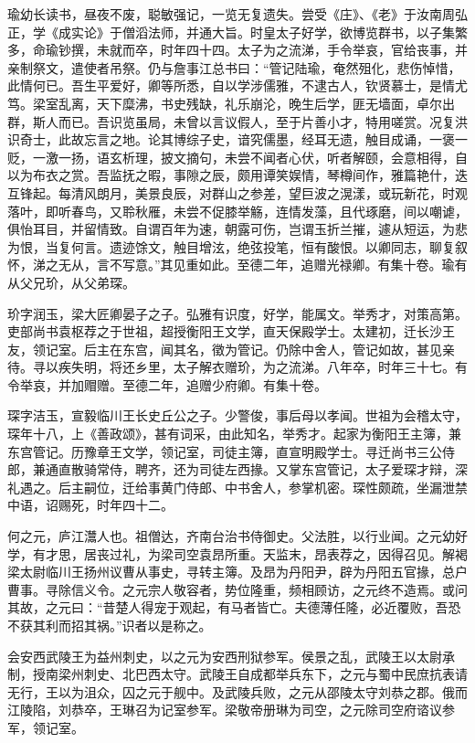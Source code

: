 \documentclass[]{article}
\begin{document}
瑜幼长读书，昼夜不废，聪敏强记，一览无复遗失。尝受《庄》、《老》于汝南周弘正，学《成实论》于僧滔法师，并通大旨。时皇太子好学，欲博览群书，以子集繁多，命瑜钞撰，未就而卒，时年四十四。太子为之流涕，手令举哀，官给丧事，并亲制祭文，遣使者吊祭。仍与詹事江总书曰：``管记陆瑜，奄然殂化，悲伤悼惜，此情何已。吾生平爱好，卿等所悉，自以学涉儒雅，不逮古人，钦贤慕士，是情尤笃。梁室乱离，天下糜沸，书史残缺，礼乐崩沦，晚生后学，匪无墙面，卓尔出群，斯人而已。吾识览虽局，未曾以言议假人，至于片善小才，特用嗟赏。况复洪识奇士，此故忘言之地。论其博综子史，谙究儒墨，经耳无遗，触目成诵，一褒一贬，一激一扬，语玄析理，披文摘句，未尝不闻者心伏，听者解颐，会意相得，自以为布衣之赏。吾监抚之暇，事隙之辰，颇用谭笑娱情，琴樽间作，雅篇艳什，迭互锋起。每清风朗月，美景良辰，对群山之参差，望巨波之滉漾，或玩新花，时观落叶，即听春鸟，又聆秋雁，未尝不促膝举觞，连情发藻，且代琢磨，间以嘲谑，俱怡耳目，并留情致。自谓百年为速，朝露可伤，岂谓玉折兰摧，遽从短运，为悲为恨，当复何言。遗迹馀文，触目增泫，绝弦投笔，恒有酸恨。以卿同志，聊复叙怀，涕之无从，言不写意。''其见重如此。至德二年，追赠光禄卿。有集十卷。瑜有从父兄玠，从父弟琛。

玠字润玉，梁大匠卿晏子之子。弘雅有识度，好学，能属文。举秀才，对策高第。吏部尚书袁枢荐之于世祖，超授衡阳王文学，直天保殿学士。太建初，迁长沙王友，领记室。后主在东宫，闻其名，徵为管记。仍除中舍人，管记如故，甚见亲待。寻以疾失明，将还乡里，太子解衣赠玠，为之流涕。八年卒，时年三十七。有令举哀，并加赗赠。至德二年，追赠少府卿。有集十卷。

琛字洁玉，宣毅临川王长史丘公之子。少警俊，事后母以孝闻。世祖为会稽太守，琛年十八，上《善政颂》，甚有词采，由此知名，举秀才。起家为衡阳王主簿，兼东宫管记。历豫章王文学，领记室，司徒主簿，直宣明殿学士。寻迁尚书三公侍郎，兼通直散骑常侍，聘齐，还为司徒左西掾。又掌东宫管记，太子爱琛才辩，深礼遇之。后主嗣位，迁给事黄门侍郎、中书舍人，参掌机密。琛性颇疏，坐漏泄禁中语，诏赐死，时年四十二。

何之元，庐江灊人也。祖僧达，齐南台治书侍御史。父法胜，以行业闻。之元幼好学，有才思，居丧过礼，为梁司空袁昂所重。天监末，昂表荐之，因得召见。解褐梁太尉临川王扬州议曹从事史，寻转主簿。及昂为丹阳尹，辟为丹阳五官掾，总户曹事。寻除信义令。之元宗人敬容者，势位隆重，频相顾访，之元终不造焉。或问其故，之元曰：``昔楚人得宠于观起，有马者皆亡。夫德薄任隆，必近覆败，吾恐不获其利而招其祸。''识者以是称之。

会安西武陵王为益州刺史，以之元为安西刑狱参军。侯景之乱，武陵王以太尉承制，授南梁州刺史、北巴西太守。武陵王自成都举兵东下，之元与蜀中民庶抗表请无行，王以为沮众，囚之元于舰中。及武陵兵败，之元从邵陵太守刘恭之郡。俄而江陵陷，刘恭卒，王琳召为记室参军。梁敬帝册琳为司空，之元除司空府谘议参军，领记室。
\end{document}
